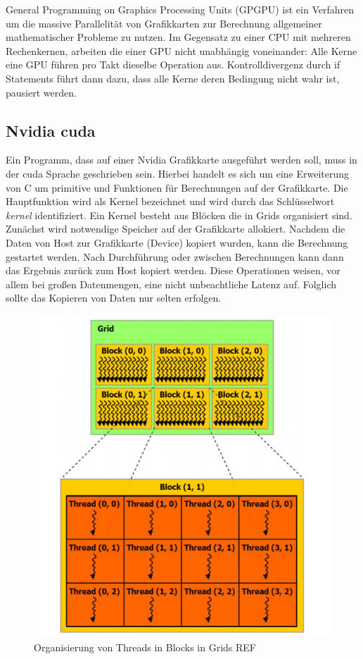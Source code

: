 General Programming on Graphics Processing Units (GPGPU) ist ein Verfahren um die massive Parallelität von Grafikkarten zur Berechnung allgemeiner mathematischer Probleme zu nutzen. Im Gegensatz zu einer CPU mit mehreren Rechenkernen, arbeiten die einer GPU nicht unabhängig voneinander: Alle Kerne eine GPU führen pro Takt dieselbe Operation aus. Kontrolldivergenz durch if Statements führt dann dazu, dass alle Kerne deren Bedingung nicht wahr ist, pausiert werden. 
\subsection{Nvidia cuda}

Ein Programm, dass auf einer Nvidia Grafikkarte ausgeführt werden soll, muss in der cuda Sprache geschrieben sein. Hierbei handelt es sich um eine Erweiterung von C um primitive und Funktionen für Berechnungen auf der Grafikkarte. Die Hauptfunktion wird als Kernel bezeichnet und wird durch das Schlüsselwort \textit{\textunderscore\textunderscore kernel\textunderscore\textunderscore} identifiziert. Ein Kernel besteht aus Blöcken die in Grids organisiert sind. Zunächst wird notwendige Speicher auf der Grafikkarte allokiert. Nachdem die Daten von Host zur Grafikkarte (Device) kopiert wurden, kann die Berechnung gestartet werden. Nach Durchführung oder zwischen Berechnungen kann dann das Ergebnis zurück zum Host kopiert werden. Diese Operationen weisen, vor allem bei großen Datenmengen, eine nicht unbeachtliche Latenz auf. Folglich sollte das Kopieren von Daten nur selten erfolgen.

\begin{figure}
	\centering
	\includegraphics[scale=0.55]{images/cuda1.png}
	\caption{Organisierung von Threads in Blocks in Grids REF}
	\label{img:example_ae}
\end{figure}

